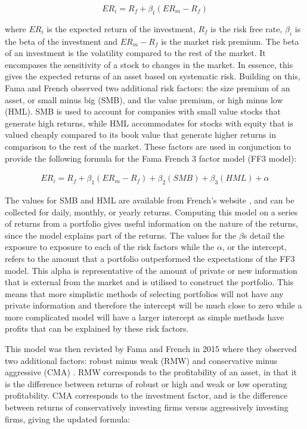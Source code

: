 \begin{equation}
ER_i = R_f + \beta_t (ER_m - R_f)
\end{equation}

\noindent
where $ER_i$ is the expected return of the investment, $R_f$ is the risk free rate, $\beta_i$ is the beta of the investment and $ER_m - R_f$ is the market risk premium. The beta of an investment is the volatility compared to the rest of the market. It encompases the sensitivity of a stock to changes in the market. In essence, this gives the expected returns of an asset based on systematic risk. Building on this, Fama and French observed two additional risk factors: the size premium of an asset, or small minus big (SMB), and the value premium, or high minus low (HML). SMB is used to account for companies with small value stocks that generate high returns, while HML accommodates for stocks with equity that is valued cheaply compared to its book value that generate higher returns in comparison to the rest of the market. These factors are used in conjunction to provide the following formula for the Fama French 3 factor model (FF3 model):

\begin{align*}
ER_i = R_f + \beta_1(ER_m -R_f) + \beta_2 (SMB) + \beta_3(HML) + \alpha
\end{align*}

The values for SMB and HML are available from French's website \cite{french_2022}, and can be collected for daily, monthly, or yearly returns. Computing this model on a series of returns from a portfolio gives useful information on the nature of the returns, since the model explains part of the returns. The values for the $\beta$s detail the exposure to exposure to each of the risk factors while the $\alpha$, or the intercept, refers to the amount that a portfolio outperformed the expectations of the FF3 model. This alpha is representative of the amount of private or new information that is external from the market and is utilised to construct the portfolio. This means that more simplistic methods of selecting portfolios will not have any private information and therefore the intercept will be much close to zero while a more complicated model will have a larger intercept as simple methods have profits that can be explained by these risk factors.

This model was then revisted by Fama and French in 2015 where they observed two additional factors: robust minus weak (RMW) and conservative minus aggressive (CMA) \cite{ff5}. RMW corresponds to the profitability of an asset, in that it is the difference between returns of robust or high and weak or low operating profitability. CMA corresponds to the investment factor, and is the difference between returns of conservatively investing firms versus aggressively investing firms, giving the updated formula:

